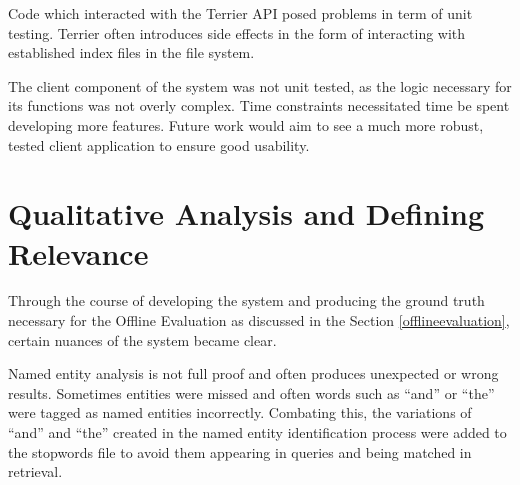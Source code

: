 \documentclass{l4proj}
\begin{document}
Code which interacted with the Terrier API posed problems in term of unit testing. Terrier often introduces side effects in the form of interacting with established index files in the file system.

The client component of the system was not unit tested, as the logic necessary for its functions was not overly complex. Time constraints necessitated time be spent developing more features. Future work would aim to see a much more robust, tested client application to ensure good usability.

\section{Qualitative Analysis and Defining Relevance} \label{qualitativeanalysis}
Through the course of developing the system and producing the ground truth necessary for the Offline Evaluation as discussed in the Section \ref{offlineevaluation}, certain nuances of the system became clear.

Named entity analysis is not full proof and often produces unexpected or wrong results. Sometimes entities were missed and often words such as ``and'' or ``the'' were tagged as named entities incorrectly. Combating this, the variations of ``and'' and ``the'' created in the named entity identification process were added to the stopwords file to avoid them appearing in queries and being matched in retrieval.
\end{document}
